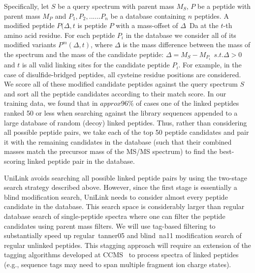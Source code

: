 Specifically, let $S$ be a query spectrum with parent mass $M_{S}$, $P$ be a peptide with parent mass $M_{P}$ and 
${P_{1}, P_{2}, ...... P_{n}}$ be a database containing $n$ peptides. A modified peptide $P(\Delta,t$ is  peptide $P$ with a mass-offset of $\Delta$~Da at the $t$-th amino acid residue. For each peptide $P_{i}$ in the database we consider all of its modified variants $P^m(\Delta,t)$, where $\Delta$ is the mass difference between the mass of the  spectrum and the mass of the candidate peptide:  $\Delta = M_{S} - M_{P_{i}}\ \  s.t. \Delta > 0$ and $t$ is all valid linking sites for the candidate peptide $P_{i}$. For example, in the case of disulfide-bridged peptides, all cysteine residue positions are considered. We score all of these modified candidate peptides against the query spectrum $S$ and sort all the peptide candidates according to their match score. In our training data, we found that in $approx 96\%$ of cases one of the linked peptides ranked 50 or less when searching against the library sequences appended to a large database of random (decoy) linked peptides.  Thus, rather than considering all possible peptide pairs, we take each of the top 50 peptide candidates and pair it with the remaining candidates in the database (such that their combined masses match the precursor mass of the  MS/MS spectrum) to find the best-scoring linked peptide pair in the database.

UniLink avoids searching all possible linked peptide pairs by using the two-stage search strategy described above.  However, since the first stage is essentially a blind modification search, UniLink needs to consider almost every peptide candidate in the database.  This search space is considerably larger than regular database search of single-peptide spectra where one can filter the peptide candidates using parent mass filters. We will use tag-based filtering to substantially speed up regular~\cite{unv}{tanner05} and blind~\cite{unv}{na11} modification search of regular unlinked peptides. This stagging approach 
will require an extension of the  tagging algorithms developed at CCMS~\cite{tanner05,jeong2011} to process spectra of linked peptides (e.g., sequence tags may need to span multiple fragment ion charge states).

